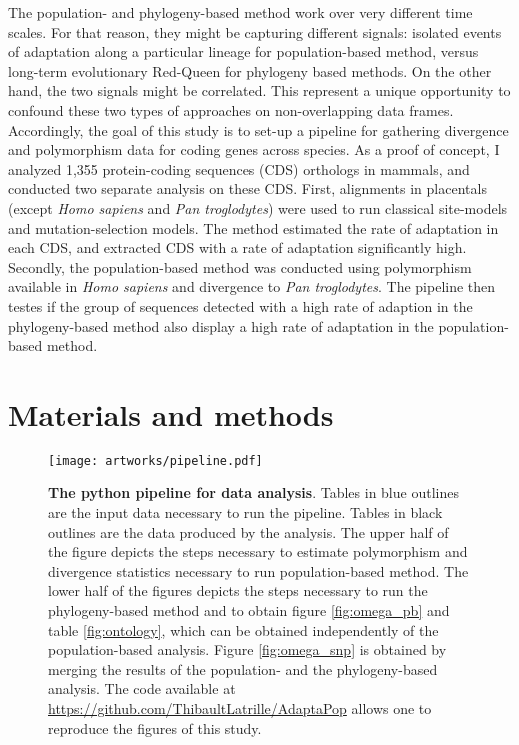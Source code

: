 \documentclass{article}
\begin{document}
	The population- and phylogeny-based method work over very different time scales.
	For that reason, they might be capturing different signals: isolated events of adaptation along a particular lineage for population-based method, versus long-term evolutionary Red-Queen for phylogeny based methods. On the other hand, the two signals might be correlated. This represent a unique opportunity to confound these two types of approaches on non-overlapping data frames. Accordingly, the goal of this study is to set-up a pipeline for gathering divergence and polymorphism data for coding genes across species. As a proof of concept, I analyzed 1,355 protein-coding sequences (CDS) orthologs in mammals, and conducted two separate analysis on these CDS. First, alignments in placentals (except \textit{Homo sapiens} and \textit{Pan troglodytes}) were used to run classical site-models and mutation-selection models. The method estimated the rate of adaptation in each CDS, and extracted CDS with a rate of adaptation significantly high. Secondly, the population-based method was conducted using polymorphism available in \textit{Homo sapiens} and divergence to \textit{Pan troglodytes}. The pipeline then testes if the group of sequences detected with a high rate of adaption in the phylogeny-based method also display a high rate of adaptation in the population-based method.

	\section*{Materials and methods}


	\begin{figure*}[hb!]
		\centering
		\texttt{[image: artworks/pipeline.pdf]}\\
		\caption{ \textbf{The python pipeline for data analysis}. Tables in blue outlines are the input data necessary to run the pipeline. Tables in black outlines are the data produced by the analysis. The upper half of the figure depicts the steps necessary to estimate polymorphism and divergence statistics necessary to run population-based method. The lower half of the figures depicts the steps necessary to run the phylogeny-based method and to obtain figure \ref{fig:omega_pb} and table \ref{fig:ontology}, which can be obtained independently of the population-based analysis. Figure \ref{fig:omega_snp} is obtained by merging the results of the population- and the phylogeny-based analysis. The code available at \href{https://github.com/ThibaultLatrille/AdaptaPop}{https://github.com/ThibaultLatrille/AdaptaPop} allows one to reproduce the figures of this study. \label{fig:pipeline}}
	\end{figure*}
\end{document}

